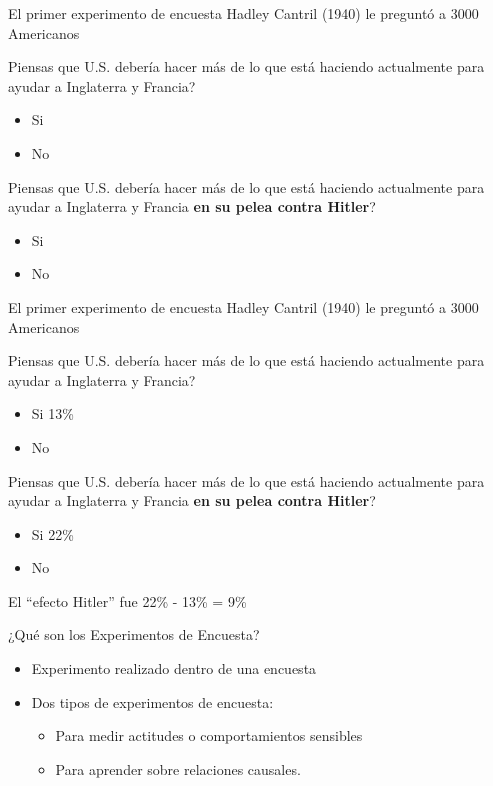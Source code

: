 \documentclass[
  ignorenonframetext,
]{beamer}
\providecommand{\tightlist}{%
  \setlength{\itemsep}{0pt}\setlength{\parskip}{0pt}}
\begin{document}
\begin{frame}{El primer experimento de encuesta}
\protect\hypertarget{el-primer-experimento-de-encuesta-1}{}
Hadley Cantril (1940) le preguntó a 3000 Americanos

Piensas que U.S. debería hacer más de lo que está haciendo actualmente
para ayudar a Inglaterra y Francia?

\begin{itemize}
\tightlist
\item
  Si
\item
  No
\end{itemize}

Piensas que U.S. debería hacer más de lo que está haciendo actualmente
para ayudar a Inglaterra y Francia \textbf{en su pelea contra Hitler}?

\begin{itemize}
\tightlist
\item
  Si
\item
  No
\end{itemize}
\end{frame}

\begin{frame}{El primer experimento de encuesta}
\protect\hypertarget{el-primer-experimento-de-encuesta-2}{}
Hadley Cantril (1940) le preguntó a 3000 Americanos

Piensas que U.S. debería hacer más de lo que está haciendo actualmente
para ayudar a Inglaterra y Francia?

\begin{itemize}
\tightlist
\item
  Si 13\%
\item
  No
\end{itemize}

Piensas que U.S. debería hacer más de lo que está haciendo actualmente
para ayudar a Inglaterra y Francia \textbf{en su pelea contra Hitler}?

\begin{itemize}
\tightlist
\item
  Si 22\%
\item
  No
\end{itemize}

El ``efecto Hitler'' fue 22\% - 13\% = 9\%
\end{frame}

\begin{frame}{¿Qué son los Experimentos de Encuesta?}
\protect\hypertarget{quuxe9-son-los-experimentos-de-encuesta}{}
\begin{itemize}
\item
  Experimento realizado dentro de una encuesta
\item
  Dos tipos de experimentos de encuesta:

  \begin{itemize}
  \tightlist
  \item
    Para medir actitudes o comportamientos sensibles
  \item
    Para aprender sobre relaciones causales.
  \end{itemize}
\end{itemize}
\end{frame}
\end{document}

